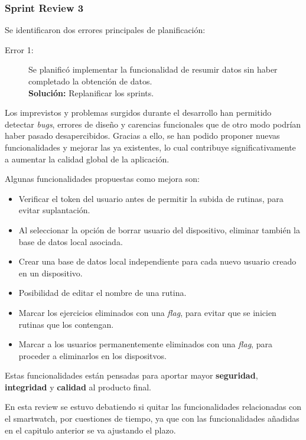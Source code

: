 \subsubsection{Sprint Review 3}

Se identificaron dos errores principales de planificación:

\begin{description}
  \item[Error 1:] Se planificó implementar la funcionalidad de resumir datos sin haber completado la obtención de datos. \\ \textbf{Solución:} Replanificar los sprints.
\end{description}

Los imprevistos y problemas surgidos durante el desarrollo han permitido detectar \textit{bugs}, errores de dise\~no y carencias funcionales que de otro modo podrían haber pasado desapercibidos. Gracias a ello, se han podido proponer nuevas funcionalidades y mejorar las ya existentes, lo cual contribuye significativamente a aumentar la calidad global de la aplicación.

Algunas funcionalidades propuestas como mejora son:

\begin{itemize}
  \item Verificar el token del usuario antes de permitir la subida de rutinas, para evitar suplantación.
  \item Al seleccionar la opción de borrar usuario del dispositivo, eliminar también la base de datos local asociada.
  \item Crear una base de datos local independiente para cada nuevo usuario creado en un dispositivo.
  \item Posibilidad de editar el nombre de una rutina.
  \item Marcar los ejercicios eliminados con una \textit{flag}, para evitar que se inicien rutinas que los contengan.
  \item Marcar a los usuarios permanentemente eliminados con una \textit{flag}, para proceder a eliminarlos en los dispositvos.
\end{itemize}

Estas funcionalidades están pensadas para aportar mayor \textbf{seguridad}, \textbf{integridad} y \textbf{calidad} al producto final.

En esta review se estuvo debatiendo si quitar las funcionalidades relacionadas con el smartwatch, por cuestiones de tiempo, ya que con las funcionalidades añadidas en el capitulo anterior se va ajustando el plazo.

